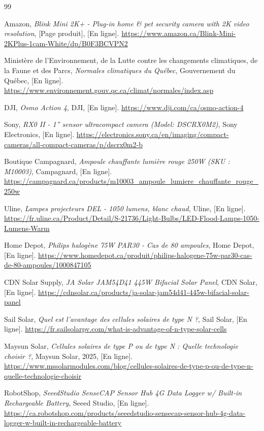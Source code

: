 \begin{thebibliographyUL}{99}

   Amazon, \emph{Blink Mini 2K+ - Plug-in home \& pet security camera with 2K video resolution}, [Page produit], [En ligne]. \url{https://www.amazon.ca/Blink-Mini-2KPlus-1cam-White/dp/B0F3BCVPN2}

   Ministère de l’Environnement, de la Lutte contre les changements climatiques, de la Faune et des Parcs, \emph{Normales climatiques du Québec}, Gouvernement du Québec, [En ligne]. \url{https://www.environnement.gouv.qc.ca/climat/normales/index.asp}

   DJI, \emph{Osmo Action 4}, DJI, [En ligne]. \url{https://www.dji.com/ca/osmo-action-4}

   Sony, \emph{RX0 II - 1” sensor ultracompact camera (Model: DSCRX0M2)}, Sony Electronics, [En ligne]. \url{https://electronics.sony.ca/en/imaging/compact-cameras/all-compact-cameras/p/dscrx0m2-b}

   Boutique Campagnard, \emph{Ampoule chauffante lumière rouge 250W (SKU : M10003)}, Campagnard, [En ligne]. \url{https://campagnard.ca/products/m10003_ampoule_lumiere_chauffante_rouge_250w}

   Uline, \emph{Lampes projecteurs DEL - 1050 lumens, blanc chaud}, Uline, [En ligne]. \url{https://fr.uline.ca/Product/Detail/S-21736/Light-Bulbs/LED-Flood-Lamps-1050-Lumens-Warm}

   Home Depot, \emph{Philips halogène 75W PAR30 - Cas de 80 ampoules}, Home Depot, [En ligne]. \url{https://www.homedepot.ca/produit/philips-halogene-75w-par30-cas-de-80-ampoules/1000847105}

   CDN Solar Supply, \emph{JA Solar JAM54D41 445W Bifacial Solar Panel}, CDN Solar, [En ligne]. \url{https://cdnsolar.ca/products/ja-solar-jam54d41-445w-bifacial-solar-panel}

   Sail Solar, \emph{Quel est l'avantage des cellules solaires de type N ?}, Sail Solar, [En ligne]. \url{https://fr.sailsolarpv.com/what-is-advantage-of-n-type-solar-cells}

   Maysun Solar, \emph{Cellules solaires de type P ou de type N : Quelle technologie choisir ?}, Maysun Solar, 2025, [En ligne]. \url{https://www.mssolarmodules.com/blog/cellules-solaires-de-type-p-ou-de-type-n-quelle-technologie-choisir}

   RobotShop, \emph{SeeedStudio SenseCAP Sensor Hub 4G Data Logger w/ Built-in Rechargeable Battery}, Seeed Studio, [En ligne]. \url{https://ca.robotshop.com/products/seeedstudio-sensecap-sensor-hub-4g-data-logger-w-built-in-rechargeable-battery}


\end{thebibliographyUL}

